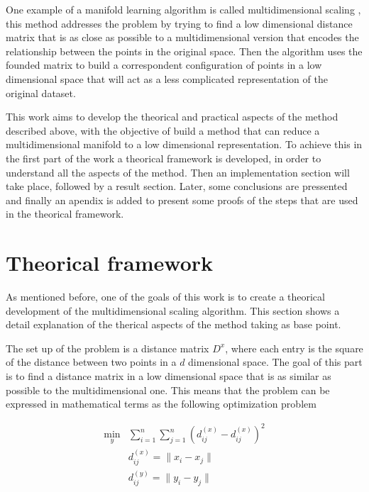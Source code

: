 \documentclass[12pt,journal]{IEEEtran}
\begin{document}
\vspace{0.5cm}

One example of a manifold learning algorithm is called multidimensional
scaling \cite{mds}, this method addresses the problem by trying to find a low
dimensional distance matrix that is as close as possible to a multidimensional
version that encodes the relationship between the points in the original space.
Then the algorithm uses the founded matrix to build a correspondent configuration
of points in a low dimensional space that will act as a less complicated
representation of the original dataset.

\vspace{0.5cm}

This work aims to develop the theorical and practical aspects of the method
described above, with the objective of build a method that can reduce a
multidimensional manifold to a low dimensional representation. To achieve this
in the first part of the work a theorical framework is developed, in order to
understand all the aspects of the method. Then an implementation section will
take place, followed by a result section. Later, some conclusions are
pressented and finally an apendix is added to present some proofs of the
steps that are used in the theorical framework.

\section{Theorical framework}

    As mentioned before, one of the goals of this work is to create a theorical
    development of the multidimensional scaling algorithm. This section shows a
    detail explanation of the therical aspects of the method taking \cite{proof}
    as base point.

    \vspace{0.5cm}

    The set up of the problem is a distance matrix $D^x$, where each
    entry is the square of the distance between two points in a $d$ dimensional
    space. The goal of this part is to find a distance matrix in a low
    dimensional space that is as similar as possible to the multidimensional one.
    This means that the problem can be expressed in mathematical terms as the
    following optimization problem

    \begin{equation*}
        \begin{aligned}
            \underset{y}{\text{min}}  & \sum_{i=1}^n \sum_{j=1}^n ( d^{(x)}_{ij} - d^{(x)}_{ij} )^2 \\
            & d_{ij}^{(x)} = \lVert x_i - x_j \rVert\\
            & d_{ij}^{(y)} = \lVert y_i - y_j \rVert
        \end{aligned}
    \end{equation*}\\
\end{document}
